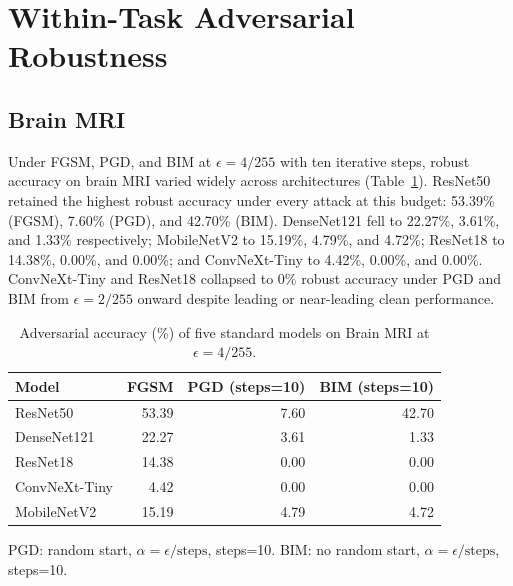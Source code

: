\documentclass[12pt,a4paper,oneside]{report}
\begin{document}
\section{Within-Task Adversarial Robustness}
\label{sec:results-within-task}


\subsection{Brain MRI}
\label{sec:results-brain}

Under FGSM, PGD, and BIM at $\epsilon = 4/255$ with ten iterative steps, robust accuracy on brain MRI varied widely across architectures (Table~\ref{tab:brain_mri_robustness_eps4}). ResNet50 retained the highest robust accuracy under every attack at this budget: 53.39\% (FGSM), 7.60\% (PGD), and 42.70\% (BIM). DenseNet121 fell to 22.27\%, 3.61\%, and 1.33\% respectively; MobileNetV2 to 15.19\%, 4.79\%, and 4.72\%; ResNet18 to 14.38\%, 0.00\%, and 0.00\%; and ConvNeXt-Tiny to 4.42\%, 0.00\%, and 0.00\%. ConvNeXt-Tiny and ResNet18 collapsed to 0\% robust accuracy under PGD and BIM from $\epsilon = 2/255$ onward despite leading or near-leading clean performance.

\begin{table}[htbp]
  \centering
  \caption{Adversarial accuracy (\%) of five standard models on Brain MRI at $\epsilon=4/255$.}
  \label{tab:brain_mri_robustness_eps4}
  \begin{tabular}{lrrr}
    \toprule
    Model & FGSM & PGD (steps=10) & BIM (steps=10) \\
    \midrule
    ResNet50        & 53.39 &  7.60 & 42.70 \\
    DenseNet121     & 22.27 &  3.61 &  1.33 \\
    ResNet18        & 14.38 &  0.00 &  0.00 \\
    ConvNeXt-Tiny   &  4.42 &  0.00 &  0.00 \\
    MobileNetV2     & 15.19 &  4.79 &  4.72 \\
    \bottomrule
  \end{tabular}
  \vspace{0.25em}
  \begin{minipage}{0.92\linewidth}
    \footnotesize
    PGD: random start, $\alpha=\epsilon/\text{steps}$, steps=10.
    BIM: no random start, $\alpha=\epsilon/\text{steps}$, steps=10.
  \end{minipage}
\end{table}
\end{document}
